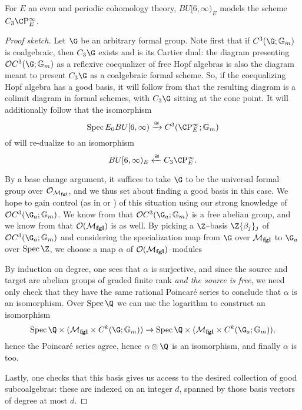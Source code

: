 \begin{theorem}
For \(E\) an even and periodic cohomology theory, \(BU[6, \infty)_E\) models the scheme \(C_3 \CP^\infty_E\).
\end{theorem}
\begin{proof}[Proof sketch]
Let \(\G\) be an arbitrary formal group.  Note first that if \(C^3(\G; \Gm)\) is coalgebraic, then \(C_3 \G\) exists and is its Cartier dual: the diagram presenting \(\sheaf OC^3(\G; \Gm)\) as a reflexive coequalizer of free Hopf algebras is also the diagram meant to present \(C_3 \G\) as a coalgebraic formal scheme.  So, if the coequalizing Hopf algebra has a good basis, it will follow from  that the resulting diagram is a colimit diagram in formal schemes, with \(C_3 \G\) sitting at the cone point.  It will additionally follow that the isomorphism \[\Spec E_0 BU[6, \infty) \xrightarrow{\cong} C^3(\CP^\infty_E; \Gm)\] of  will re-dualize to an isomorphism \[BU[6, \infty)_E \xleftarrow{\cong} C_3 \CP^\infty_E.\]

By a base change argument, it suffices to take \(\G\) to be the universal formal group over \(\mathcal{O}_{\mathcal{M}_{\mathbf{fgl}}}\), and we thus set about finding a good basis in this case.  We hope to gain control (as in  or ) of this situation using our strong knowledge of \(\sheaf O C^3(\G_a; \Gm)\).  We know from  that \(\sheaf O C^3(\G_a; \Gm)\) is a free abelian group, and we know from  that \(\mathcal{O}(\mathcal{M}_{\mathbf{fgl}})\) is as well.  By picking a \(\Z\)--basis \(\Z\{\beta_j\}_j\) of \(\sheaf O C^3(\G_a; \Gm)\) and considering the specialization map from \(\G\) over \(\mathcal{M}_{\mathbf{fgl}}\) to \(\G_a\) over \(\Spec \Z\), we choose a map \(\alpha\) of \(\mathcal{O}(\mathcal{M}_{\mathbf{fgl}})\)--modules
\begin{center}
\end{center}
By induction on degree, one sees that \(\alpha\) is surjective, and since the source and target are abelian groups of graded finite rank \emph{and the source is free}, we need only check that they have the same rational Poincar\'e series to conclude that \(\alpha\) is an isomorphism.  Over \(\Spec \Q\) we can use the logarithm to construct an isomorphism \[\Spec \Q \times (\moduli{fgl} \times C^k(\G; \Gm)) \to \Spec \Q \times (\moduli{fgl} \times C^k(\G_a; \Gm)),\] hence the Poincar\'e series agree, hence \(\alpha \otimes \Q\) is an isomorphism, and finally \(\alpha\) is too.

Lastly, one checks that this basis gives us access to the desired collection of good subcoalgebras: these are indexed on an integer \(d\), spanned by those basis vectors of degree at most \(d\).
\end{proof}
